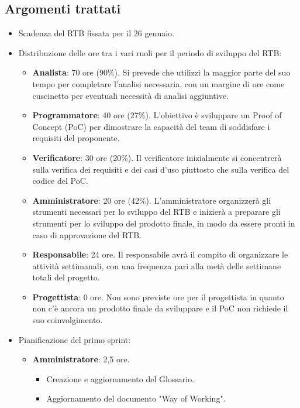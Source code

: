 \documentclass[a4paper, 12pt]{article}
\begin{document}
\subsection{Argomenti trattati}
\begin{itemize}
    \item Scadenza del RTB fissata per il 26 gennaio.
    \item Distribuzione delle ore tra i vari ruoli per il periodo di sviluppo del RTB:
    \begin{itemize}
        \item \textbf{Analista}: 70 ore (90\%). Si prevede che utilizzi la maggior parte del suo tempo per completare l'analisi necessaria, con un margine di ore come cuscinetto per eventuali necessità di analisi aggiuntive.
        \item \textbf{Programmatore}: 40 ore (27\%). L'obiettivo è sviluppare un Proof of Concept (PoC) per dimostrare la capacità del team di soddisfare i requisiti del proponente.
        \item \textbf{Verificatore}: 30 ore (20\%). Il verificatore inizialmente si concentrerà sulla verifica dei requisiti e dei casi d'uso piuttosto che sulla verifica del codice del PoC.
        \item \textbf{Amministratore}: 20 ore (42\%). L'amministratore organizzerà gli strumenti necessari per lo sviluppo del RTB e inizierà a preparare gli strumenti per lo sviluppo del prodotto finale, in modo da essere pronti in caso di approvazione del RTB.
        \item \textbf{Responsabile}: 24 ore. Il responsabile avrà il compito di organizzare le attività settimanali, con una frequenza pari alla metà delle settimane totali del progetto.
        \item \textbf{Progettista}: 0 ore. Non sono previste ore per il progettista in quanto non c'è ancora un prodotto finale da sviluppare e il PoC non richiede il suo coinvolgimento.
    \end{itemize}
    \item Pianificazione del primo sprint:
    \begin{itemize}
        \item \textbf{Amministratore}: 2,5 ore.
            \begin{itemize}
                \item Creazione e aggiornamento del Glossario.
                \item Aggiornamento del documento "Way of Working".
            \end{itemize}

\end{itemize}
\end{itemize}
\end{document}
